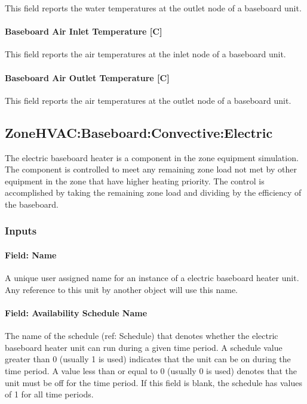 This field reports the water temperatures at the outlet node of a baseboard unit.

\paragraph{Baseboard Air Inlet Temperature {[}C{]}}\label{baseboard-air-inlet-temperature-c-1}

This field reports the air temperatures at the inlet node of a baseboard unit.

\paragraph{Baseboard Air Outlet Temperature {[}C{]}}\label{baseboard-air-outlet-temperature-c-1}

This field reports the air temperatures at the outlet node of a baseboard unit.

\subsection{ZoneHVAC:Baseboard:Convective:Electric}\label{zonehvacbaseboardconvectiveelectric}

The electric baseboard heater is a component in the zone equipment simulation. The component is controlled to meet any remaining zone load not met by other equipment in the zone that have higher heating priority. The control is accomplished by taking the remaining zone load and dividing by the efficiency of the baseboard.

\subsubsection{Inputs}\label{inputs-4-025}

\paragraph{Field: Name}\label{field-name-4-022}

A unique user assigned name for an instance of a electric baseboard heater unit. Any reference to this unit by another object will use this name.

\paragraph{Field: Availability Schedule Name}\label{field-availability-schedule-name-4-005}

The name of the schedule (ref: Schedule) that denotes whether the electric baseboard heater unit can run during a given time period. A schedule value greater than 0 (usually 1 is used) indicates that the unit can be on during the time period. A value less than or equal to 0 (usually 0 is used) denotes that the unit must be off for the time period. If this field is blank, the schedule has values of 1 for all time periods.


